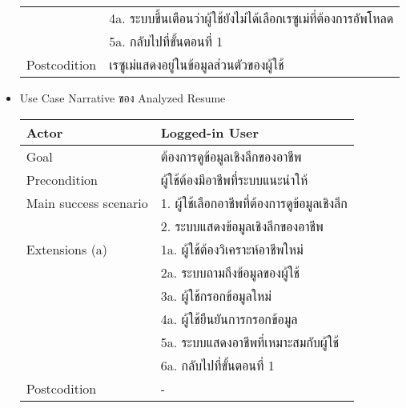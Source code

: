 \begin{itemize}
\begin{table}[!h]
\begin{tabular}{|l|l|}
                                        & 4a. ระบบขึ้นเตือนว่าผู้ใช้ยังไม่ได้เลือกเรซูเม่ที่ต้องการอัพโหลด \\
                                        & 5a. กลับไปที่ขั้นตอนที่ 1                              \\ \hline
                  Postcodition          & เรซูเม่แสดงอยู่ในข้อมูลส่วนตัวของผู้ใช้                    \\ \hline
              \end{tabular}
          \end{table}
    \item Use Case Narrative ของ Analyzed Resume
          \begin{table}[!h]
              \begin{tabular}{|l|l|} \hline
                  Actor                 & Logged-in User                  \\ \hline
                  Goal                  & ต้องการดูข้อมูลเชิงลึกของอาชีพ         \\ \hline
                  Precondition          & ผู้ใช้ต้องมีอาชีพที่ระบบแนะนำให้          \\ \hline
                  Main success scenario & 1. ผู้ใช้เลือกอาชีพที่ต้องการดูข้อมูลเชิงลึก \\
                                        & 2. ระบบแสดงข้อมูลเชิงลึกของอาชีพ     \\ \hline
                  Extensions (a)        & 1a. ผู้ใช้ต้องวิเคราะห์อาชีพใหม่        \\
                                        & 2a. ระบบถามถึงข้อมูลของผู้ใช้         \\
                                        & 3a. ผู้ใช้กรอกข้อมูลใหม่              \\
                                        & 4a. ผู้ใช้ยืนยันการกรอกข้อมูล          \\
                                        & 5a. ระบบแสดงอาชีพที่เหมาะสมกับผู้ใช้   \\
                                        & 6a. กลับไปที่ขั้นตอนที่ 1              \\ \hline
                  Postcodition          & -                               \\ \hline
              \end{tabular}
          \end{table}
\end{itemize}



